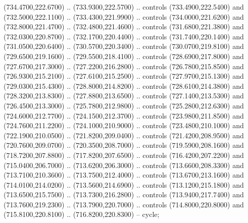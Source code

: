 {\begin{scope}[y=0.80pt, x=0.80pt, yscale=-1, xscale=1, inner sep=0pt, outer sep=0pt, #1]
      (734.4700,222.6700) .. (733.9300,222.5700) .. controls (733.4900,222.5400) and
      (732.5000,222.1100) .. (733.4300,221.9900) .. controls (734.0000,221.6200) and
      (732.8000,221.4700) .. (732.4800,221.4600) .. controls (731.6800,221.3800) and
      (732.0300,220.8700) .. (732.1700,220.4400) .. controls (731.7400,220.1400) and
      (731.0500,220.6400) .. (730.5700,220.3400) .. controls (730.0700,219.8100) and
      (729.6500,219.1600) .. (729.5500,218.4100) .. controls (728.6900,217.8000) and
      (727.6700,217.3000) .. (727.2200,216.2800) .. controls (726.7800,215.8500) and
      (726.9300,215.2100) .. (727.6100,215.2500) .. controls (727.9700,215.1300) and
      (729.0300,215.4300) .. (728.8000,214.8200) .. controls (728.6100,214.3800) and
      (728.3200,213.8300) .. (727.8800,213.6500) .. controls (727.1400,213.5300) and
      (726.4500,213.3000) .. (725.7800,212.9800) .. controls (725.2800,212.6300) and
      (724.6000,212.7700) .. (724.1500,212.3700) .. controls (723.9800,211.8500) and
      (724.7600,211.2200) .. (724.1000,210.9000) .. controls (723.4800,210.1000) and
      (722.1900,210.0500) .. (721.8200,209.0400) .. controls (721.4200,208.9500) and
      (720.7600,209.0700) .. (720.3500,208.7000) .. controls (719.5900,208.1600) and
      (718.7200,207.8800) .. (717.8200,207.6500) .. controls (716.4200,207.2200) and
      (715.0400,206.7000) .. (713.6200,206.3000) .. controls (713.6600,208.3300) and
      (713.7100,210.3600) .. (713.7500,212.4000) .. controls (713.6700,213.1600) and
      (714.0100,214.0200) .. (713.5600,214.6900) .. controls (713.1200,215.1800) and
      (713.6500,215.7500) .. (713.7300,216.2800) .. controls (713.9400,217.7400) and
      (713.7600,219.2300) .. (713.7900,220.7000) .. controls (714.8000,220.8000) and
      (715.8100,220.8100) .. (716.8200,220.8300) -- cycle;


\end{scope}}
